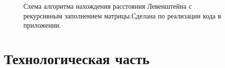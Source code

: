 \documentclass[a4paper]{article}
\begin{document}
	\begin{figure}[h]
	
	\caption{Схема алгоритма нахождения расстояния Левенштейна с рекурсивным заполнением матрицы.Сделана по реализации кода в приложении. \centering}
	\label{image4}
\end{figure}


	

	
	\clearpage
	
	\section{Технологическая часть}
\end{document}

